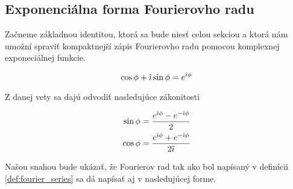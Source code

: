 \subsection{Exponenciálna forma Fourierovho radu}

Začneme základnou identitou, ktorá sa bude niesť celou sekciou a ktorá
nám umožní spraviť kompaktnejší zápis Fourierovho radu pomocou
komplexnej exponeciálnej funkcie.

\begin{veta}
    \begin{equation}
        \cos \phi + \hat{\imath} \sin \phi = e^{\hat{\imath} \phi}
    \end{equation}
\end{veta}

Z danej vety sa dajú odvodiť nasledujúce zákonitosti
\begin{lema}
    \begin{align}
        \sin \phi &= \frac{e^{\hat{\imath} \phi} - e^{-\hat{\imath} \phi}}{2} \\
        \cos \phi &= \frac{e^{\hat{\imath} \phi} + e^{-\hat{\imath} \phi}}{2\hat{\imath}} \\
    \end{align}
\end{lema}

Našou snahou bude ukázať, že Fourierov rad tak ako bol napísaný 
v definícii \ref{def:fourier_series} sa dá napísať aj v nasledujúcej
forme.

